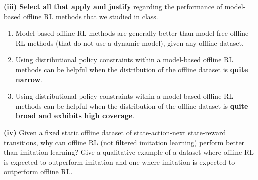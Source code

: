 \documentclass[12pt]{article}
\begin{document}
\begin{tcolorbox}[fit,height=10em, width=40em, blank, borderline={1pt}{1pt},nobeforeafter]
            \begin{center}
            \end{center}
            \end{tcolorbox}

\textbf{(iii) Select all that apply and justify} regarding the performance of model-based offline RL methods that we studied in class. 
    \begin{enumerate}
        \item Model-based offline RL methods are generally better than model-free offline RL methods (that do not use a dynamic model), given any offline dataset.
        \item Using distributional policy constraints within a model-based offline RL methods can be helpful when the distribution of the offline dataset is \textbf{quite narrow}.
        \item Using distributional policy constraints within a model-based offline RL methods can be helpful when the distribution of the offline dataset is \textbf{quite broad and exhibits high coverage}.
    \end{enumerate}

\begin{tcolorbox}[fit,height=10em, width=40em, blank, borderline={1pt}{1pt},nobeforeafter]
            \begin{center}
            \end{center}
            \end{tcolorbox}

\textbf{(iv)} Given a fixed static offline dataset of state-action-next state-reward transitions, why can offline RL (not filtered imitation learning) perform better than imitation learning? Give a qualitative example of a dataset where offline RL is expected to outperform imitation and one where imitation is expected to outperform offline RL.

\begin{tcolorbox}[fit,height=10em, width=40em, blank, borderline={1pt}{1pt},nobeforeafter]
            \begin{center}
            \end{center}
            \end{tcolorbox}
\end{document}
